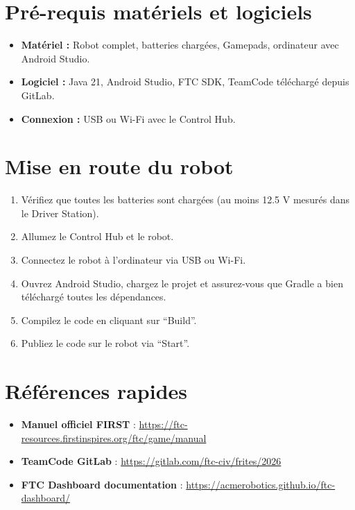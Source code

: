 \documentclass[12pt, a4paper]{report}
\begin{document}
    \section*{Pré-requis matériels et logiciels}
    \begin{itemize}
        \item \textbf{Matériel :} Robot complet, batteries chargées, Gamepads, ordinateur avec Android Studio.
        \item \textbf{Logiciel :} Java 21, Android Studio, FTC SDK, TeamCode téléchargé depuis GitLab.
        \item \textbf{Connexion :} USB ou Wi-Fi avec le Control Hub.
    \end{itemize}


    \section*{Mise en route du robot}
    \begin{enumerate}
        \item Vérifiez que toutes les batteries sont chargées (au moins 12.5 V mesurés dans le Driver Station).
        \item Allumez le Control Hub et le robot.
        \item Connectez le robot à l'ordinateur via USB ou Wi-Fi.
        \item Ouvrez Android Studio, chargez le projet et assurez-vous que Gradle a bien téléchargé toutes les dépendances.
        \item Compilez le code en cliquant sur \enquote{Build}.
        \item Publiez le code sur le robot via \enquote{Start}.
    \end{enumerate}


    \section*{Références rapides}
    \begin{itemize}
        \item \textbf{Manuel officiel FIRST} : \url{https://ftc-resources.firstinspires.org/ftc/game/manual}
        \item \textbf{TeamCode GitLab} : \url{https://gitlab.com/ftc-civ/frites/2026}
        \item \textbf{FTC Dashboard documentation} : \url{https://acmerobotics.github.io/ftc-dashboard/}
    \end{itemize}
\end{document}

